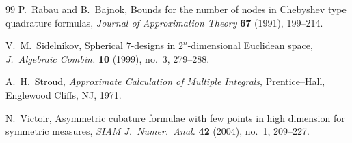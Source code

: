 \documentclass{amsart}
\theoremstyle{definition}
\theoremstyle{remark}
\numberwithin{equation}{section}
\begin{document}
\begin{thebibliography}{99}
P.~Rabau and B.~Bajnok,
\newblock Bounds for the number of nodes in Chebyshev type quadrature formulas,
\newblock \emph{Journal of Approximation Theory} \textbf{67} (1991), 199--214.

V.~M.~Sidelnikov,
\newblock Spherical $7$-designs in $2^n$-dimensional Euclidean space,
\newblock \emph{J.\ Algebraic Combin.} \textbf{10} (1999), no.~3, 279--288.

A.~H.~Stroud,
\newblock \emph{Approximate Calculation of Multiple Integrals},
\newblock Prentice--Hall, Englewood Cliffs, NJ, 1971.

N.~Victoir,
\newblock Asymmetric cubature formulae with few points in high dimension for symmetric measures,
\newblock \emph{SIAM J.\ Numer.\ Anal.} \textbf{42} (2004), no.~1, 209--227.

\end{thebibliography}
\end{document}
